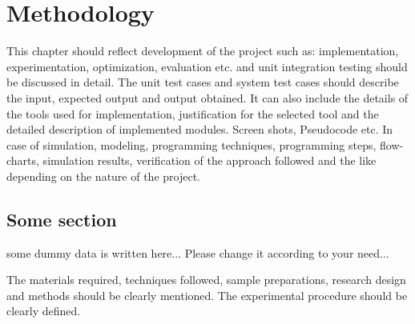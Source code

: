 \chapter{Methodology}
This chapter should reflect development of the project such as: implementation, experimentation, optimization, evaluation etc. and unit integration testing should be discussed in detail.  The unit test cases and system test cases should describe the input, expected output and output obtained. It can also include the details of the tools used for implementation, justification for the selected tool and the detailed description of implemented modules.  Screen shots, Pseudocode etc. 
In case of simulation, modeling, programming techniques, programming steps, flow-charts, simulation results, verification of the approach followed and the like depending on the nature of the project. 
\section{Some section}
some dummy data is written here... Please change it according to your need...

The materials required, techniques followed, sample preparations, research design and methods should be clearly mentioned. The experimental procedure should be clearly defined.